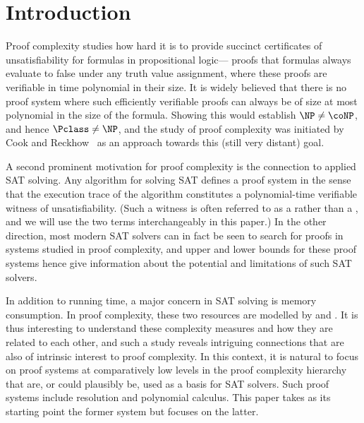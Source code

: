 \documentclass{toc}
\begin{document}
\begin{frontmatter}
\begin{abstract}
  Our proofs use techniques introduced by
  Bonacina and Galesi (ITCS'13).  Our final contribution, however, is to show
  that these techniques provably cannot yield non-constant space lower
  bounds for the functional pigeonhole principle, delineating the
  limitations of this framework.
\end{abstract}
 
%

\end{frontmatter}

%
%
%

%
\section{Introduction}
\label{sec:introduction}

Proof complexity studies how hard it is to provide succinct
certificates of unsatisfiability for formulas in propositional logic---\ieComma
proofs that formulas always evaluate to false under any truth value
assignment, where these proofs are verifiable in time polynomial in
their size.
%
It is widely believed that there is no proof system where such
efficiently verifiable proofs can always be  of size at most
polynomial in the size of the formula.
%
Showing this would establish $\NP \neq \coNP$, and hence
$\Pclass \neq \NP$, and the study of proof complexity was initiated by
Cook and Reckhow~\cite{CR79Relative} as an approach towards this
(still very distant) goal.

A second prominent motivation for proof complexity is the connection
to applied SAT solving. 
%
Any algorithm for solving SAT defines a proof system in the
sense that the execution trace of the algorithm constitutes a
polynomial-time verifiable witness of unsatisfiability. %
(Such a witness
is often referred to as a  rather than a
, and we will use the two terms interchangeably in
this paper.) %
In the other direction, most modern SAT solvers can in
fact be seen to search for proofs in systems studied in proof
complexity, and upper and lower bounds for these proof systems hence
give information about the potential and limitations of 
such SAT solvers.

In addition to running time, a major concern in SAT solving is memory
consumption. 
In proof complexity, these two resources are modelled by
and
.
%
It is thus interesting to understand these
complexity measures and how they are related to each other, and such a
study reveals intriguing connections that are also of intrinsic
interest to proof complexity. In this context, it is natural to focus
on proof systems at comparatively low levels in the proof complexity
hierarchy that are, or could plausibly be, used as a basis for SAT
solvers. Such proof systems include resolution and polynomial
calculus. This paper takes as its starting point the former system but
focuses on the latter.
\end{document}
